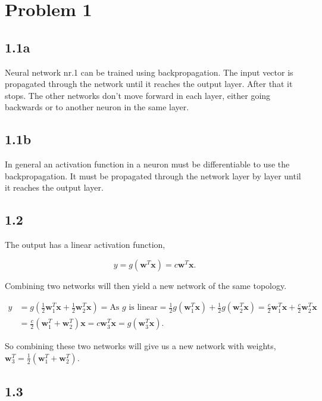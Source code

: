 \documentclass{article}
\begin{document}





\section*{Problem 1}
\subsection*{1.1a}
Neural network nr.1 can be trained using backpropagation. The input vector is propagated through the network until it reaches the output layer. After that it stops. The other networks don't move forward in each layer, either going backwards or to another neuron in the same layer.

\subsection*{1.1b}
In general an activation function in a neuron must be differentiable to use the backpropagation. It must be propagated through the network layer by layer until it reaches the output layer.

\subsection*{1.2}
The output has a linear activation function,

\begin{equation}
y = g(\bm{w}^T\bm{x}) = c \bm{w}^T \bm{x}.
\end{equation}

Combining two networks will then yield a new network of the same 
topology. 

\begin{align*}
	y & =g(\frac{1}{2} \bm{w}_1^T \bm{x}+\frac{1}{2} \bm{w}_2^{T} \bm{x}) = \text{As } g \text{ is linear} = \frac{1}{2}g(\bm{w}_1^T \bm{x})+\frac{1}{2}g(\bm{w}_2^T \bm{x}) = \frac{c}{2}\bm{w}_1^T\bm{x}+\frac{c}{2}\bm{w}_2^T\bm{x} \\ & = \frac{c}{2}(\bm{w}_1^T+\bm{w}_2^T)\bm{x} = c \bm{w}_3^T \bm{x} = g(\bm{w}_3^T\bm{x}).
\end{align*}

So combining these two networks will give us a new network with weights, $\bm{w}_3^T=\frac{1}{2}(\bm{w}_1^T+\bm{w}_2^T)$.


\subsection*{1.3}
\end{document}
